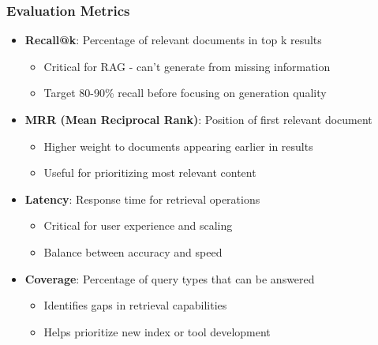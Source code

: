 {    \begin{frame}
        \frametitle{Evaluation Metrics}
        \begin{itemize}
            \item \textbf{Recall@k}: Percentage of relevant documents in top k results
            \begin{itemize}
                \item Critical for RAG - can't generate from missing information
                \item Target 80-90\% recall before focusing on generation quality
            \end{itemize}
            \item \textbf{MRR (Mean Reciprocal Rank)}: Position of first relevant document
            \begin{itemize}
                \item Higher weight to documents appearing earlier in results
                \item Useful for prioritizing most relevant content
            \end{itemize}
            \item \textbf{Latency}: Response time for retrieval operations
            \begin{itemize}
                \item Critical for user experience and scaling
                \item Balance between accuracy and speed
            \end{itemize}
            \item \textbf{Coverage}: Percentage of query types that can be answered
            \begin{itemize}
                \item Identifies gaps in retrieval capabilities
                \item Helps prioritize new index or tool development
            \end{itemize}
        \end{itemize}
    \end{frame}

}
